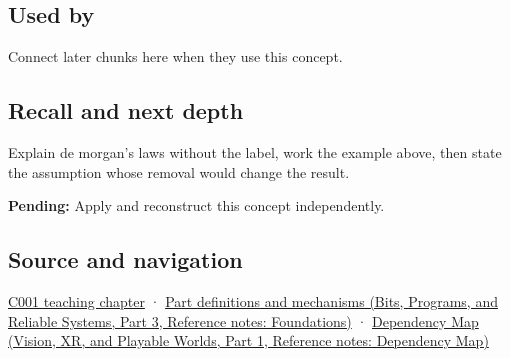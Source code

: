 \subsection{Used by}\label{appendix-9079d3659da4-used-by}

\hypertarget{appendix-9079d3659da4-used-by}{}

Connect later chunks here when they use this concept.

\subsection{Recall and next depth}\label{appendix-9079d3659da4-recall-and-next-depth}

\hypertarget{appendix-9079d3659da4-recall-and-next-depth}{}

Explain de morgan's laws without the label, work the example above, then state the assumption whose removal would change the result.

\textbf{Pending:} Apply and reconstruct this concept independently.

\subsection{Source and navigation}\label{appendix-9079d3659da4-source-and-navigation}

\hypertarget{appendix-9079d3659da4-source-and-navigation}{}

\hyperref[01-foundations-i-ch001-from-a-signal-to-an-interpretation]{C001 teaching chapter} · \href{../01-Bits-Programs-and-Reliable-Systems-P03/main.pdf\#nameddest=appendix-fd090d982a15}{Part definitions and mechanisms (Bits, Programs, and Reliable Systems, Part 3, Reference notes: Foundations)} · \href{../07-Vision-XR-and-Playable-Worlds-P01/main.pdf\#nameddest=appendix-4ad47bdd269a}{Dependency Map (Vision, XR, and Playable Worlds, Part 1, Reference notes: Dependency Map)}
